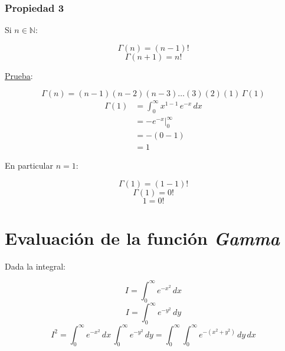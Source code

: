 \subsubsection*{Propiedad 3}
Si $n\in\mathbb{N}$:

\begin{equation}
    \Gamma(n)=(n-1)!
\end{equation}
\begin{equation}
    \Gamma(n+1)=n!
\end{equation}

\underline{Prueba}:

\begin{equation*}
    \Gamma(n)=(n-1)(n-2)(n-3)\dots(3)(2)(1)\,\Gamma(1)
\end{equation*}
\begin{equation*}
\begin{split}
    \Gamma(1)
        &=\int_0^{\infty}x^{1-1}\,e^{-x}\,dx\\
        &=-e^{-x}\Biggr|_0^{\infty}\\
        &=-(0-1)\\
        &=1
\end{split}
\end{equation*}

En particular $n=1$:

\begin{equation*}
    \Gamma(1)=(1-1)!
\end{equation*}
\begin{equation*}
    \Gamma(1)=0!
\end{equation*}
\begin{equation}
    1=0!
\end{equation}

\section{Evaluación de la función \emph{Gamma}}
Dada la integral:

\begin{equation*}
    I=\int_0^{\infty}e^{-x^2}\,dx
\end{equation*}
\begin{equation*}
    I=\int_0^{\infty}e^{-y^2}\,dy
\end{equation*}
\begin{equation*}
    I^2=\int_0^{\infty}e^{-x^2}\,dx\,\int_0^{\infty}e^{-y^2}\,dy
        =\int_0^{\infty}\int_0^{\infty}e^{-(x^2+y^2)}\,dy\,dx
\end{equation*}


